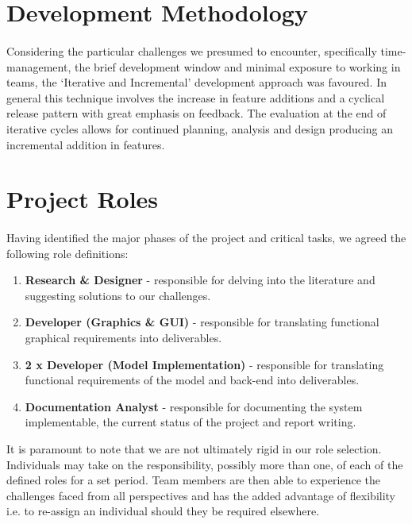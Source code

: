 \documentclass[11pt,a4paper]{article}
\begin{document}
\section{Development Methodology}
\paragraph{}
Considering the particular challenges we presumed to encounter, specifically time-management, the brief development window and minimal exposure to working in teams, the ‘Iterative and Incremental’ development approach was favoured.  In general this technique involves the increase in feature additions and a cyclical release pattern with great emphasis on feedback.  The evaluation at the end of iterative cycles allows for continued planning, analysis and design producing an incremental addition in features.

\section{Project Roles}
\paragraph{}
Having identified the major phases of the project and critical tasks, we agreed the following role definitions:

\begin{enumerate}
  \item \textbf{Research \& Designer} - responsible for delving into the literature and suggesting solutions to our challenges.
  \item \textbf{Developer (Graphics \& GUI)} - responsible for translating functional graphical requirements into deliverables.
  \item \textbf{2 x Developer (Model Implementation)} - responsible for translating functional requirements of the model and back-end into deliverables.
  \item \textbf{Documentation Analyst} - responsible for documenting the system implementable, the current status of the project and report writing.
\end{enumerate}

It is paramount to note that we are not ultimately rigid in our role selection.  Individuals may take on the responsibility, possibly more than one, of each of the defined roles for a set period.  Team members are then able to experience the challenges faced from all perspectives and has the added advantage of flexibility i.e. to re-assign an individual should they be required elsewhere.
\end{document}
